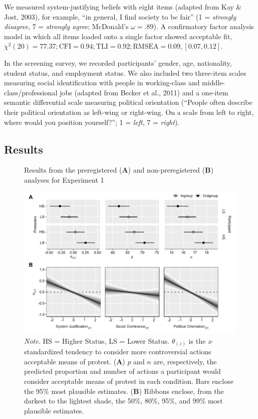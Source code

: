\documentclass[12pt, letterpaper]{article}
\begin{document}
We measured system-justifying beliefs with eight items (adapted from Kay
\& Jost, 2003), for example, ``in general, I find society to be fair''
(1 = \emph{strongly disagree}, 7 = \emph{strongly agree}; McDonald's
\(\omega = .89\)). A confirmatory factor analysis model in which all
items loaded onto a single factor showed acceptable fit,
\(\chi^2 (20) = 77.37; \text{CFI} = 0.94; \text{TLI} = 0.92; \text{RMSEA} = 0.09, [0.07, 0.12]\).

In the screening survey, we recorded participants' gender, age,
nationality, student status, and employment status. We also included two
three-item scales measuring social identification with people in
working-class and middle-class/professional jobs (adapted from Becker et
al., 2011) and a one-item semantic differential scale measuring
political orientation (``People often describe their political
orientation as left-wing or right-wing. On a scale from left to right,
where would you position yourself?''; 1 = \emph{left}, 7 =
\emph{right}).

\hypertarget{results}{%
\subsection{Results}\label{results}}

\begin{figure}[!t]
\centering
\caption{Results from the preregistered (\textbf{A}) and non-preregistered (\textbf{B}) analyses for Experiment 1}
\includegraphics[scale=1]{../Experiment 1/figures/figure-3}
\caption*{\textit{Note.} HS = Higher Status, LS = Lower Status. $\theta_{(z)}$ is the \textit{z}-standardized tendency to consider more controversial actions acceptable means of protest. (\textbf{A}) $p$ and $n$ are, respectively, the predicted proportion and number of actions a participant would consider acceptable means of protest in each condition. Bars enclose the 95\% most plausible estimates. (\textbf{B}) Ribbons enclose, from the darkest to the lightest shade, the 50\%, 80\%, 95\%, and 99\% most plausible estimates.}
\label{fig:f3}
\end{figure}
\end{document}
